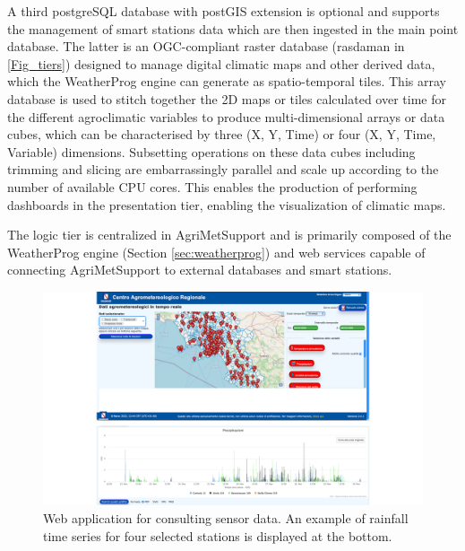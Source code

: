 \documentclass[authoryear,preprint,review,12pt]{elsarticle}
\begin{document}
A third postgreSQL database with postGIS extension is optional and supports the management of smart stations data which are then ingested in the main point database.
The latter is an OGC-compliant raster database (rasdaman in \cref{Fig_tiers}) designed to manage digital climatic maps and other derived data, which the WeatherProg engine can generate as spatio-temporal tiles.
This array database is used to stitch together the 2D maps or tiles calculated over time for the different agroclimatic variables to produce multi-dimensional arrays or data cubes, which can be  characterised by three (X, Y, Time) or four (X, Y, Time, Variable) dimensions.
Subsetting operations on these data cubes including trimming and slicing are embarrassingly parallel and scale up according to the number of available CPU cores.
This enables the production of performing dashboards in the presentation tier, enabling the visualization of climatic maps.

The logic tier is centralized in Agri\-Met\-Support and is primarily composed of the WeatherProg engine (Section \ref{sec:weatherprog}) and web services capable of connecting Agri\-Met\-Support to external databases and smart stations.

\begin{figure}[!t] %
	\centering %
	\includegraphics[angle=0,scale=.4,trim=0cm 0cm 0cm 0cm,clip]{Fig03_SensorDataConsultingApp.png}
	\caption{ Web application for consulting sensor data. 
              An example of rainfall time series for four selected stations is displayed at the bottom.}
	\label{Fig_webapp}
\end{figure}
\end{document}
